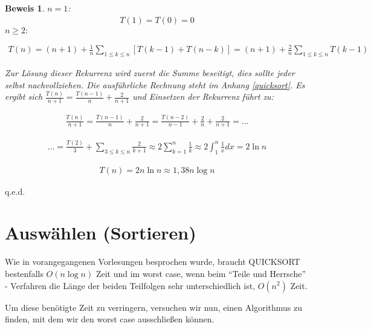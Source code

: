 \documentclass[ngerman,draft,parskip=half*,twoside]{scrreprt}
\theoremstyle{break}
\newtheorem{beweis}{Beweis}
\begin{document}
\begin{beweis}
$n=1$:
\begin{gather*}
T(1)=T(0)=0
\end{gather*}
$n \geq 2:$

\begin{gather*}
T(n)=(n+1)+ \frac{1}{n}\sum_{1\leq k\leq n}[T(k-1)+ T(n-k)]= (n+1)+ \frac{2}{n} \sum_{1\leq k\leq n}T(k-1)
\end{gather*}

Zur Lösung dieser Rekurrenz wird zuerst die Summe beseitigt, dies sollte jeder selbst nachvollziehen.
Die ausführliche Rechnung steht im Anhang \ref{quicksort}. Es ergibt sich \(\frac{T(n)}{n+1}= \frac{T(n-1)}{n}+ \frac{2}{n+1}\) und
Einsetzen der Rekurrenz führt zu:


\begin{gather*}
\frac{T(n)}{n+1}= \frac{T(n-1)}{n}+ \frac{2}{n+1}=\frac{T(n-2)}{n-1}+\frac{2}{n}+\frac{2}{n+1}=\ldots
\end{gather*}

\begin{gather*}
\ldots= \frac{T(2)}{3}+ \sum_{3\leq k \leq n}\frac{2}{k+1} \approx 2\sum_{k=1}^{n}\frac{1}{k}\approx 2
\int_{1}^{n}\frac{1}{x} dx =2 \ln n
\end{gather*}

\begin{gather*}
T(n)=2n  \ln n \approx 1,38 n   \log n
\end{gather*}
\end{beweis}
\hfill q.e.d.
%
 \section{Auswählen (Sortieren)}
 Wie in vorangegangenen Vorlesungen besprochen wurde, braucht \textsc{QUICKSORT} bestenfalls $O(n \log n)$ Zeit und im
 worst case, wenn beim "`Teile und Herrsche"' - Verfahren die Länge der beiden Teilfolgen sehr unterschiedlich ist, $O(n^{2})$ Zeit.

 Um diese benötigte Zeit zu verringern, versuchen wir nun, einen Algorithmus zu finden, mit dem wir den worst case ausschließen
 können.
\end{document}
